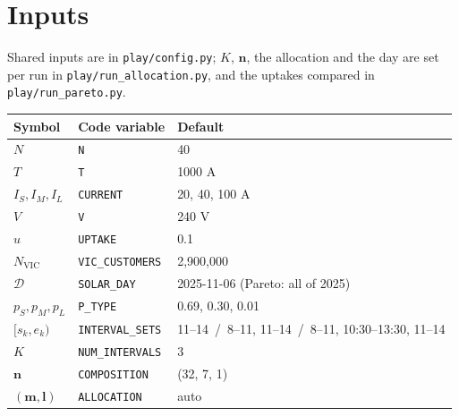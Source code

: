 \documentclass[11pt,a4paper]{article}
\begin{document}
\section{Inputs}
Shared inputs are in \texttt{play/config.py}; \(K\), \(\boldsymbol n\), the allocation and the
day are set per run in \texttt{play/run\_allocation.py}, and the uptakes compared in
\texttt{play/run\_pareto.py}.
\begin{center}
\begin{tabular}{lll}
\toprule
Symbol & Code variable & Default\\
\midrule
\(N\) & \texttt{N} & 40\\
\(T\) & \texttt{T} & 1000 A\\
\(I_S,I_M,I_L\) & \texttt{CURRENT} & 20, 40, 100 A\\
\(V\) & \texttt{V} & 240 V\\
\(u\) & \texttt{UPTAKE} & 0.1\\
\(N_{\mathrm{VIC}}\) & \texttt{VIC\_CUSTOMERS} & 2{,}900{,}000\\
\(\mathcal D\) & \texttt{SOLAR\_DAY} & 2025-11-06 (Pareto: all of 2025)\\
\(p_S,p_M,p_L\) & \texttt{P\_TYPE} & 0.69, 0.30, 0.01\\
\([s_k,e_k)\) & \texttt{INTERVAL\_SETS} & 11--14 \,/\, 8--11, 11--14 \,/\, 8--11, 10:30--13:30, 11--14\\
\(K\) & \texttt{NUM\_INTERVALS} & 3\\
\(\boldsymbol n\) & \texttt{COMPOSITION} & (32, 7, 1)\\
\((\boldsymbol m,\boldsymbol l)\) & \texttt{ALLOCATION} & auto\\
\bottomrule
\end{tabular}
\end{center}
\end{document}
